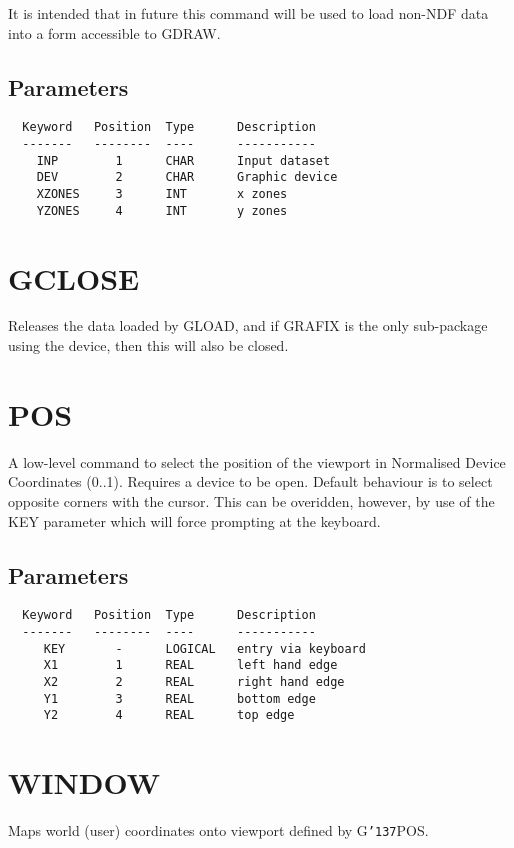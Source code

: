 \documentclass{book}
\renewcommand{\_}{{\tt\char'137}}     %
\begin{document}
It is intended that in future this command will be used to load
non-NDF data into a form accessible to GDRAW.

\subsection{Parameters}
\begin{verbatim}
  Keyword   Position  Type      Description
  -------   --------  ----      -----------
    INP        1      CHAR      Input dataset
    DEV        2      CHAR      Graphic device
    XZONES     3      INT       x zones
    YZONES     4      INT       y zones

\end{verbatim}\section{GCLOSE}
Releases the data loaded by GLOAD, and if GRAFIX is the only
sub-package using the device, then this will also be closed.

\section{POS}
A low-level command to select the position of the viewport in Normalised
Device Coordinates (0..1). Requires a device to be open. Default
behaviour is to select opposite corners with the cursor. This can
be overidden, however, by use of the KEY parameter which will force
prompting at the keyboard.

\subsection{Parameters}
\begin{verbatim}
  Keyword   Position  Type      Description
  -------   --------  ----      -----------
     KEY       -      LOGICAL   entry via keyboard
     X1        1      REAL      left hand edge
     X2        2      REAL      right hand edge
     Y1        3      REAL      bottom edge
     Y2        4      REAL      top edge
\end{verbatim}\section{WINDOW}
Maps world (user) coordinates onto viewport defined by G\_POS.
\end{document}
